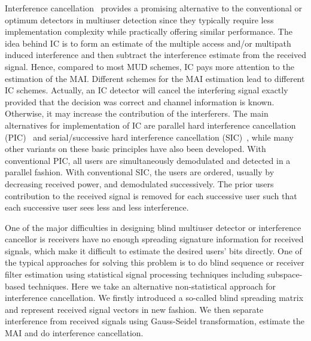 \documentclass[a4paper,10pt,fleqn, twocolumn]{IEEETran}
\begin{document}
Interference
cancellation~\cite{Yoon93,Patel94,Wijk95,Divsalar96,Kim98,Bugallo01}
provides a promising alternative to the conventional or optimum
detectors in multiuser detection since they typically require less
implementation complexity while practically offering similar
performance. The idea behind IC is to form an estimate of the
multiple access and/or multipath induced interference and then
subtract the interference estimate from the received signal.
Hence, compared to most MUD schemes, IC pays more attention to the
estimation of the MAI. Different schemes for the MAI estimation
lead to different IC schemes. Actually, an IC detector will cancel
the interfering signal exactly provided that the decision was
correct and channel information is known. Otherwise, it may
increase the contribution of the interferers. The main
alternatives for implementation of IC are parallel hard
interference cancellation (PIC)~\cite{Divsalar96,Kim98} and
serial/successive hard interference cancellation
(SIC)~\cite{Patel94,Wijk95}, while many other variants on these
basic principles have also been developed. With conventional PIC,
all users are simultaneously demodulated and detected in a
parallel fashion. With conventional SIC, the users are ordered,
usually by decreasing received power, and demodulated
successively. The prior users contribution to the received signal
is removed for each successive user such that each successive user
sees less and less interference.

One of the major difficulties in designing blind multiuser
detector or interference cancellor is receivers have no enough
spreading signature information for received signals, which make
it difficult to estimate the desired users' bits directly. One of
the typical approaches for solving this problem is to do blind
sequence or receiver filter estimation using statistical signal
processing techniques including subspace-based techniques. Here we
take an alternative non-statistical approach for interference
cancellation. We firstly introduced a so-called blind spreading
matrix and represent received signal vectors in new fashion. We
then separate interference from received signals using
Gauss-Seidel transformation, estimate the MAI and do interference
cancellation.
\end{document}

